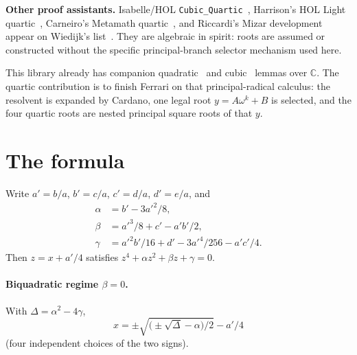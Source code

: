 \documentclass[11pt,a4paper]{article}
\newcommand{\C}{\mathbb{C}}
\begin{document}
\textbf{Other proof assistants.}
Isabelle/{HOL} \texttt{Cubic\_Quartic}~\cite{chaieb2021isabelle}, Harrison's {HOL} Light quartic~\cite{harrisonhol}, Carneiro's Metamath quartic~\cite{carneiroquartic}, and Riccardi's Mizar development~\cite{riccardi2009} appear on Wiedijk's list~\cite{wiedijk100}.
They are algebraic in spirit: roots are assumed or constructed without the specific principal-branch selector mechanism used here.

This library already has companion quadratic~\cite{lemma_quadratic_lean} and cubic~\cite{lemma_cubic_lean} lemmas over \(\C\).
The quartic contribution is to finish Ferrari on that principal-radical calculus: the resolvent is expanded by Cardano, one legal root \(y=A\omega^{k}+B\) is selected, and the four quartic roots are nested principal square roots of that \(y\).

\section{The formula}
\label{sec:formula}

Write \(a'=b/a\), \(b'=c/a\), \(c'=d/a\), \(d'=e/a\), and
\begin{align*}
\alpha&=b'-3a'^2/8,\\
\beta&=a'^3/8+c'-a'b'/2,\\
\gamma&=a'^2 b'/16+d'-3a'^4/256-a'c'/4.
\end{align*}
Then \(z=x+a'/4\) satisfies \(z^4+\alpha z^2+\beta z+\gamma=0\).

\paragraph{Biquadratic regime \(\beta=0\).}
With \(\Delta=\alpha^2-4\gamma\),
\[
x=\pm\sqrt{\bigl(\pm\sqrt{\Delta}-\alpha\bigr)/2}-a'/4
\]
(four independent choices of the two signs).
\end{document}
